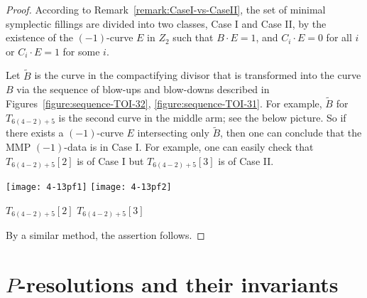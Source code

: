 \documentclass[reqno, twoside, a4paper]{amsart}
\theoremstyle{definition}
\numberwithin{equation}{section}
\begin{document}

\begin{proof}
According to Remark~\ref{remark:CaseI-vs-CaseII}, the set of minimal symplectic fillings are divided into two classes, Case I and Case II, by the existence of the $(-1)$-curve $E$ in $Z_2$ such that $B \cdot E=1$, and $C_i \cdot E = 0$ for all $i$ or $C_i \cdot E=1$ for some $i$.

Let $\widetilde{B}$ is the curve in the compactifying divisor that is transformed into the curve $B$ via the sequence of blow-ups and blow-downs described in Figures~\ref{figure:sequence-TOI-32}, \ref{figure:sequence-TOI-31}. For example, $\widetilde{B}$ for $T_{6(4-2)+5}$ is the second curve in the middle arm; see the below picture. So if there exists a $(-1)$-curve $E$ intersecting only $\widetilde{B}$, then one can conclude that the MMP $(-1)$-data is in Case I. For example, one can easily check that $T_{6(4-2)+5}[2]$ is of Case I but $T_{6(4-2)+5}[3]$ is of Case II.

\begin{minipage}{\textwidth}
\centering
\texttt{[image: 4-13pf1]} \quad \texttt{[image: 4-13pf2]}

$T_{6(4-2)+5}[2]$ \hspace{3.5cm} $T_{6(4-2)+5}[3]$
\end{minipage}

By a similar method, the assertion follows.
\end{proof}




\section{$P$-resolutions and their invariants}
\label{section:list}
\end{document}
